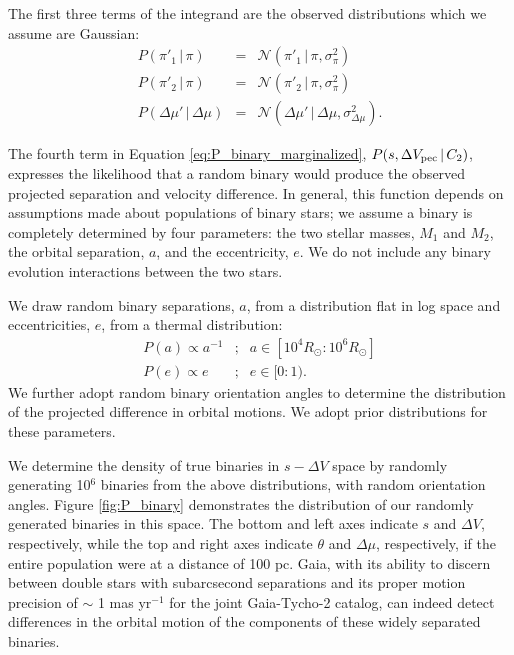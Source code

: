 \documentclass[usenatbib]{mnras}
\newcommand{\given}{\,|\,}
\begin{document}
The first three terms of the integrand are the observed distributions which we assume are Gaussian:
\begin{eqnarray}
P(\pi'_1 \given \pi) &=& \mathcal{N}(\pi'_1 \given \pi, \sigma^2_{\pi}) \\
P(\pi'_2 \given \pi) &=& \mathcal{N}(\pi'_2 \given \pi, \sigma^2_{\pi}) \\
P(\Delta \mu' \given \Delta \mu) &=& \mathcal{N}( \Delta \mu' \given \Delta \mu, \sigma^2_{\Delta \mu} ).
\end{eqnarray}



The fourth term in Equation \ref{eq:P_binary_marginalized}, $P(s, \Delta V_{\rm pec} \given C_2)$, expresses the likelihood that a random binary would produce the observed projected separation and velocity difference. In general, this function depends on assumptions made about populations of binary stars; we assume a binary is completely determined by four parameters: the two stellar masses, $M_1$ and $M_2$, the orbital separation, $a$, and the eccentricity, $e$. We do not include any binary evolution interactions between the two stars. 

We draw random binary separations, $a$, from a distribution flat in log space and eccentricities, $e$, from a thermal distribution:
\begin{eqnarray}
P(a) \propto a^{-1} &;& a \in [10^4 R_{\odot}:10^6 R_{\odot}] \\
P(e) \propto e\ \ \ &;& e \in [0:1).
\end{eqnarray}
We further adopt random binary orientation angles to determine the distribution of the projected difference in orbital motions. We adopt prior distributions for these parameters. 

We determine the density of true binaries in $s-\Delta V$ space by randomly generating 10$^6$ binaries from the above distributions, with random orientation angles. Figure \ref{fig:P_binary} demonstrates the distribution of our randomly generated binaries in this space. The bottom and left axes indicate $s$ and $\Delta V$, respectively, while the top and right axes indicate $\theta$ and $\Delta \mu$, respectively, if the entire population were at a distance of 100 pc. Gaia, with its ability to discern between double stars with subarcsecond separations and its proper motion precision of $\sim$ 1 mas yr$^{-1}$ for the joint Gaia-Tycho-2 catalog, can indeed detect differences in the orbital motion of the components of these widely separated binaries.
\end{document}
